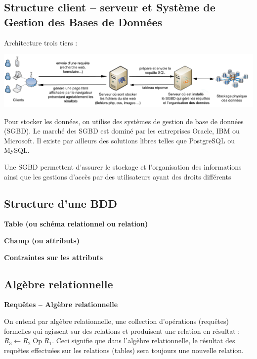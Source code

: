 \documentclass[10pt,fleqn]{article} %
\begin{document}

\vspace{2cm}
\pagestyle{fancy}
\thispagestyle{plain}


\subsection*{Structure client -- serveur et Système de Gestion des Bases de Données}

Architecture trois tiers : 
\begin{center}
\includegraphics[width=.9\textwidth]{images/bdd}
\end{center}
Pour stocker les données, on utilise des systèmes de gestion de base de données (SGBD). Le marché des SGBD est dominé par les entreprises Oracle, IBM ou Microsoft. Il existe par ailleurs des solutions libres telles que PostgreSQL ou MySQL. 

Une SGBD permettent d'assurer le stockage et l'organisation des informations ainsi que les gestions d'accès par des utilisateurs ayant des droits différents

\subsection*{Structure d'une BDD}
\begin{defi}
\textbf{Table (ou schéma relationnel ou relation)}

\textbf{Champ (ou attributs)}

\textbf{Contraintes sur les attributs}
\end{defi}


\subsection*{Algèbre relationnelle}


\begin{defi}
\textbf{Requêtes -- Algèbre relationnelle}

On entend par algèbre relationnelle, une collection d'opérations (requêtes) formelles qui agissent sur des relations et produisent une relation en résultat : $R_3 \leftarrow R_2 \;  \text{Op} \;  R_1$. Ceci signifie que dans l'algèbre relationnelle, le résultat des requêtes effectuées sur les relations (tables) sera toujours une nouvelle relation. 
\end{defi}
\end{document}
